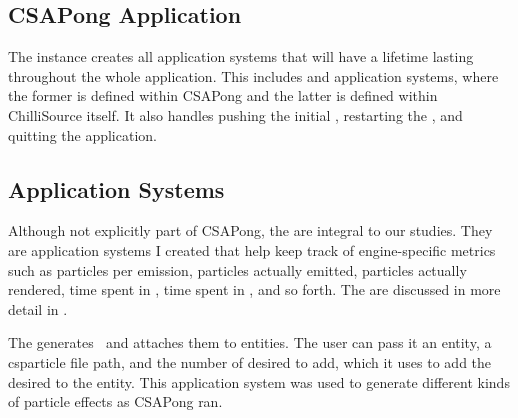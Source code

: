 
\subsection{CSAPong Application}\label{ssec:game_arch_application}

The  instance creates all application systems that will have a lifetime lasting throughout the whole application. This includes  and  application systems, where the former is defined within CSAPong and the latter is defined within ChilliSource itself. It also handles pushing the initial , restarting the , and quitting the application.

\subsection{Application Systems}\label{ssec:game_arch_profiling}

Although not explicitly part of CSAPong, the  are integral to our studies. They are application systems I created that help keep track of engine-specific metrics such as particles per emission, particles actually emitted, particles actually rendered, time spent in , time spent in , and so forth. The  are discussed in more detail in . 

The  generates $ \ $  and attaches them to entities. The user can pass it an entity, a csparticle file path, and the number of desired  to add, which it uses to add the desired  to the entity. This application system was used to generate different kinds of particle effects as CSAPong ran. 

